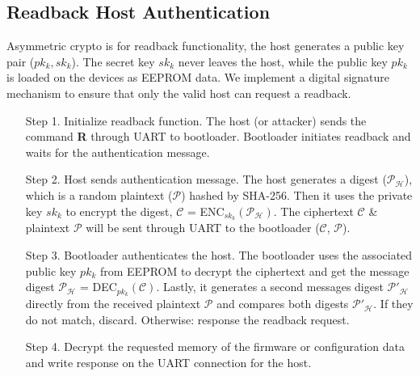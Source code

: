 \documentclass[11pt,oneside,onecolumn,letterpaper]{article}
\begin{document}
\subsection{Readback Host Authentication}
Asymmetric crypto is for readback functionality, the host generates a public key pair ($pk_k, sk_k$).
The secret key $sk_k$ never leaves the host, while the public key $pk_k$ is loaded on the devices as EEPROM data.
We implement a digital signature mechanism to ensure that only the valid host can request a readback.
\begin{itemize}
  \item[Step 1.] Initialize readback function. 
  The host (or attacker) sends the command \textbf{R} through UART to bootloader.
  Bootloader initiates readback and waits for the authentication message.  
  \item[Step 2.] Host sends authentication message.
  The host generates a digest ($\mathcal{P_H}$), which is a random plaintext ($\mathcal{P}$) hashed by SHA-256.
  Then it uses the private key $sk_k$ to encrypt the digest, $\mathcal{C}$ = ENC$_{sk_k}(\mathcal{P_H})$.
  The ciphertext $\mathcal{C}$ \& plaintext $\mathcal{P}$ will be sent through UART to the bootloader ($\mathcal{C}$, $\mathcal{P}$).
  \item[Step 3.] Bootloader authenticates the host.
  The bootloader uses the associated public key $pk_k$ from EEPROM to decrypt the ciphertext and get the message digest $\mathcal{P_H}$ = DEC$_{pk_k}(\mathcal{C})$.
  Lastly, it generates a second messages digest $\mathcal{P'_H}$ directly from the received plaintext $\mathcal{P}$ and compares both digests $\mathcal{P'_H}$.
  If they do not match, discard.
  Otherwise: response the readback request.
  
  \item [Step 4.] Decrypt the requested memory of the firmware or configuration data and write response on the UART connection for the host.
\end{itemize}



\end{document}
